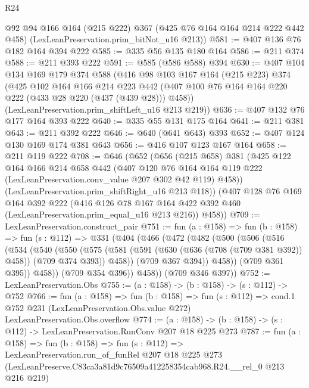 \begin{lexlean}{R24}
\begin{coremodule}
      @92
      @94
      @166
      @164
      (@215 @222)
      @367
      (@425 @76 @164 @164 @214 @222 @442 @458)
      (LexLeanPreservation.prim_bitNot_u16 @213))
@581 := @407 @136 @76 @182 @164 @394 @222
@585 := @335 @56 @135 @180 @164
@586 := @211 @374
@588 := @211 @393 @222
@591 := @585 (@586 @588) @394
@630 := @407
    @104
    @134
    @169
    @179
    @374
    @588
    (@416
      @98
      @103
      @167
      @164
      (@215 @223)
      @374
      (@425
        @102
        @164
        @166
        @214
        @223
        @442
        (@407 @100 @76 @164 @164 @220 @222 (@433 @28 @220 (@437 (@439 @28))) @458))
      (LexLeanPreservation.prim_shiftLeft_u16 @213 @219))
@636 := @407 @132 @76 @177 @164 @393 @222
@640 := @335 @55 @131 @175 @164
@641 := @211 @381
@643 := @211 @392 @222
@646 := @640 (@641 @643) @393
@652 := @407 @124 @130 @169 @174 @381 @643
@656 := @416 @107 @123 @167 @164
@658 := @211 @119 @222
@708 := @646
    (@652
      (@656
        (@215 @658)
        @381
        (@425
          @122
          @164
          @166
          @214
          @658
          @442
          (@407
            @120
            @76
            @164
            @164
            @119
            @222
            (LexLeanPreservation.conv_value @207 @302 @42 @119)
            @458))
        (LexLeanPreservation.prim_shiftRight_u16 @213 @118))
      (@407
        @128
        @76
        @169
        @164
        @392
        @222
        (@416 @126 @78 @167 @164 @422 @392 @460 (LexLeanPreservation.prim_equal_u16 @213 @216))
        @458))
@709 := LexLeanPreservation.construct_pair
@751 := fun (a : @158) =>
  fun (b : @158) =>
  fun (s : @112) =>
  @331
    (@404
      (@466
        (@472
          (@482
            (@500
              (@506
                (@516
                  (@534
                    (@540
                      (@550
                        (@575
                          (@581
                            (@591 (@630 (@636 (@708 (@709 @381 @392)) @458)) (@709 @374 @393))
                            @458))
                        (@709 @367 @394))
                      @458))
                  (@709 @361 @395))
                @458))
            (@709 @354 @396))
          @458))
      (@709 @346 @397))
@752 := LexLeanPreservation.Obs
@755 := (a : @158) -> (b : @158) -> (s : @112) -> @752
@766 := fun (a : @158) =>
  fun (b : @158) =>
  fun (s : @112) =>
  cond.{1} @752 @231 (LexLeanPreservation.Obs.value @272) LexLeanPreservation.Obs.overflow
@774 := (a : @158) -> (b : @158) -> (s : @112) -> LexLeanPreservation.RunConv @207 @18 @225 @273
@787 := fun (a : @158) =>
  fun (b : @158) =>
  fun (s : @112) =>
  LexLeanPreservation.run_of_funRel
    @207
    @18
    @225
    @273
    (LexLeanPreserve.C83ca3a81d9c76509a412258354cab968.R24.__rel_0 @213 @216 @219)
\end{coremodule}
\end{lexlean}
